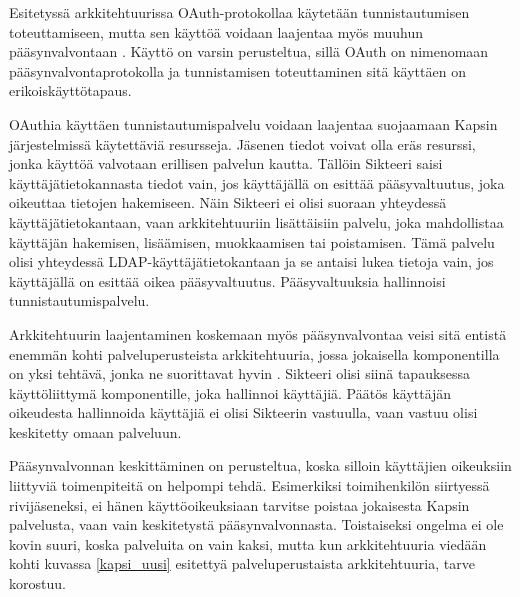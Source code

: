 Esitetyssä arkkitehtuurissa OAuth-protokollaa käytetään tunnistautumisen toteuttamiseen, mutta sen käyttöä voidaan laajentaa myös muuhun pääsynvalvontaan \cite{distributed_web_security}. Käyttö on varsin perusteltua, sillä OAuth on nimenomaan pääsynvalvontaprotokolla ja tunnistamisen toteuttaminen sitä käyttäen on erikoiskäyttötapaus.

OAuthia käyttäen tunnistautumispalvelu voidaan laajentaa suojaamaan Kapsin järjestelmissä käytettäviä resursseja. Jäsenen tiedot voivat olla eräs resurssi, jonka käyttöä valvotaan erillisen pal\-ve\-lun kautta. Tällöin Sikteeri saisi käyttäjätietokannasta tiedot vain, jos käyttäjällä on esittää pääsyvaltuutus, joka oikeuttaa tietojen hakemiseen. Näin Sikteeri ei olisi suoraan yhteydessä käyttäjätietokantaan, vaan arkkitehtuuriin lisättäisiin palvelu, joka mahdollistaa käyttäjän hakemisen, lisäämisen, muokkaamisen tai poistamisen. Tämä palvelu olisi yhteydessä LDAP-käyttäjätietokantaan ja se antaisi lukea tietoja vain, jos käyttäjällä on esittää oikea pääsyvaltuutus. Pääsyvaltuuksia hallinnoisi tunnistautumispalvelu.

Arkkitehtuurin laajentaminen koskemaan myös pääsynvalvontaa veisi sitä entistä enemmän kohti palveluperusteista arkkitehtuuria, jossa jokaisella komponentilla on yksi tehtävä, jonka ne suorittavat hyvin \cite{soa}. Sikteeri olisi siinä tapauksessa käyttöliittymä komponentille, joka hallinnoi käyttäjiä. Päätös käyttäjän oikeudesta hallinnoida käyttäjiä ei olisi Sikteerin vastuulla, vaan vastuu olisi keskitetty omaan palveluun.

Pääsynvalvonnan keskittäminen on perusteltua, koska silloin käyttäjien oikeuksiin liittyviä toimenpiteitä on helpompi tehdä. Esimerkiksi toimihenkilön siirtyessä rivijäseneksi, ei hänen käyttöoikeuksiaan tarvitse poistaa jokaisesta Kapsin palvelusta, vaan vain keskitetystä pääsynvalvonnasta. Toistaiseksi ongelma ei ole kovin suuri, koska palveluita on vain kaksi, mutta kun arkkitehtuuria viedään kohti kuvassa \ref{kapsi_uusi} esitettyä palveluperustaista arkkitehtuuria, tarve korostuu.